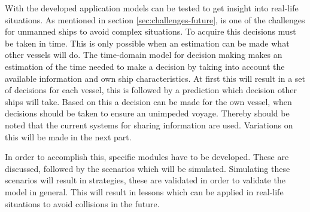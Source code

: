 With the developed application models can be tested to get insight into real-life situations. As mentioned in section \ref{sec:challenges-future}, is one of the challenges for unmanned ships to avoid complex situations. To acquire this decisions must be taken in time. This is only possible when an estimation can be made what other vessels will do. The time-domain model for decision making makes an estimation of the time needed to make a decision by taking into account the available information and own ship characteristics. At first this will result in a set of decisions for each vessel, this is followed by a prediction which decision other ships will take. Based on this a decision can be made for the own vessel, when decisions should be taken to ensure an unimpeded voyage. Thereby should be noted that the current systems for sharing information are used. Variations on this will be made in the next part.

In order to accomplish this, specific modules have to be developed. These are discussed, followed by the scenarios which will be simulated. Simulating these scenarios will result in strategies, these are validated in order to validate the model in general. This will result in lessons which can be applied in real-life situations to avoid collisions in the future.